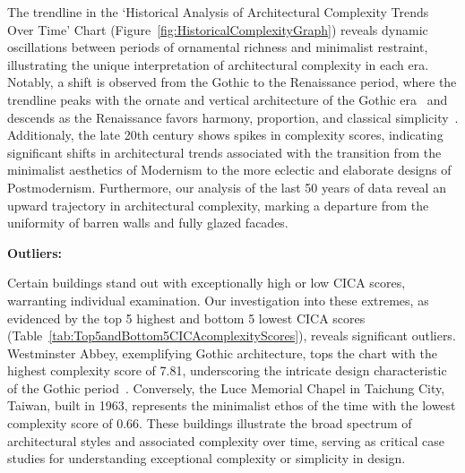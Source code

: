 The trendline in the `Historical Analysis of Architectural Complexity Trends Over Time' Chart (Figure~\ref{fig:HistoricalComplexityGraph}) reveals dynamic oscillations between periods of ornamental richness and minimalist restraint, illustrating the unique interpretation of architectural complexity in each era.
Notably, a shift is observed from the Gothic to the Renaissance period, where the trendline peaks with the ornate and vertical architecture of the Gothic era~\cite{Kennedy2013} and descends as the Renaissance favors harmony, proportion, and classical simplicity~\cite{Marder1990}.
Additionaly, the late 20th century shows spikes in complexity scores, indicating significant shifts in architectural trends associated with the transition from the minimalist aesthetics of Modernism to the more eclectic and elaborate designs of Postmodernism.
Furthermore, our analysis of the last 50 years of data reveal an upward trajectory in architectural complexity, marking a departure from the uniformity of barren walls and fully glazed facades.

\textbf{Outliers:}

Certain buildings stand out with exceptionally high or low CICA scores, warranting individual examination.
Our investigation into these extremes, as evidenced by the top 5 highest and bottom 5 lowest CICA scores (Table~\ref{tab:Top5andBottom5CICAcomplexityScores}), reveals significant outliers.
Westminster Abbey, exemplifying Gothic architecture, tops the chart with the highest complexity score of 7.81, underscoring the intricate design characteristic of the Gothic period~\cite{Kennedy2013}.
Conversely, the Luce Memorial Chapel in Taichung City, Taiwan, built in 1963, represents the minimalist ethos of the time with the lowest complexity score of 0.66.
These buildings illustrate the broad spectrum of architectural styles and associated complexity over time, serving as critical case studies for understanding exceptional complexity or simplicity in design.




